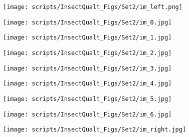 \documentclass[10pt,twocolumn,letterpaper]{article}
\begin{document}
\begin{figure*}[t]
\begin{center}
    \begin{subfigure}[b]{0.1\textwidth}
        \centering
        \texttt{[image: scripts/InsectQualt\_Figs/Set2/im\_left.png]}
    \end{subfigure}
    \hfill
    \begin{subfigure}[b]{0.1\textwidth}
        \centering
        \texttt{[image: scripts/InsectQualt\_Figs/Set2/im\_0.jpg]}
    \end{subfigure}
    \hfill
    \begin{subfigure}[b]{0.1\textwidth}
        \centering
        \texttt{[image: scripts/InsectQualt\_Figs/Set2/im\_1.jpg]}
    \end{subfigure}
    \hfill
    \begin{subfigure}[b]{0.1\textwidth}
        \centering
        \texttt{[image: scripts/InsectQualt\_Figs/Set2/im\_2.jpg]}
    \end{subfigure}
    \hfill
    \begin{subfigure}[b]{0.1\textwidth}
        \centering
        \texttt{[image: scripts/InsectQualt\_Figs/Set2/im\_3.jpg]}
    \end{subfigure}
    \hfill
    \begin{subfigure}[b]{0.1\textwidth}
        \centering
        \texttt{[image: scripts/InsectQualt\_Figs/Set2/im\_4.jpg]}
    \end{subfigure}
    \hfill
    \begin{subfigure}[b]{0.1\textwidth}
        \centering
        \texttt{[image: scripts/InsectQualt\_Figs/Set2/im\_5.jpg]}
    \end{subfigure}
    \hfill
    \begin{subfigure}[b]{0.1\textwidth}
        \centering
        \texttt{[image: scripts/InsectQualt\_Figs/Set2/im\_6.jpg]}
    \end{subfigure}
    \hfill
    \begin{subfigure}[b]{0.1\textwidth}
        \centering
        \texttt{[image: scripts/InsectQualt\_Figs/Set2/im\_right.jpg]}
    \end{subfigure}
    



\end{center}
\end{figure*}
\end{document}
